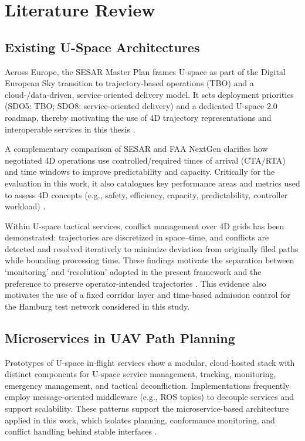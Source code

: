 \chapter{Literature Review}%
\label{s_literature}

\section{Existing U-Space Architectures}%
\label{s_motivation}

Across Europe, the SESAR Master Plan frames U-space as part of the Digital European Sky transition to trajectory-based operations (TBO) and a cloud-/data-driven, service-oriented delivery model. It sets deployment priorities (SDO5: TBO; SDO8: service-oriented delivery) and a dedicated U-space 2.0 roadmap, thereby motivating the use of 4D trajectory representations and interoperable services in this thesis \cite{sesar_master_plan_2025}.

A complementary comparison of SESAR and FAA NextGen clarifies how negotiated 4D operations use controlled/required times of arrival (CTA/RTA) and time windows to improve predictability and capacity. Critically for the evaluation in this work, it also catalogues key performance areas and metrics used to assess 4D concepts (e.g., safety, efficiency, capacity, predictability, controller workload) \cite{enea_porretta_4d_tbo_comparison}.

Within U-space tactical services, conflict management over 4D grids has been demonstrated: trajectories are discretized in space–time, and conflicts are detected and resolved iteratively to minimize deviation from originally filed paths while bounding processing time. These findings motivate the separation between ‘monitoring’ and ‘resolution’ adopted in the present framework and the preference to preserve operator-intended trajectories \cite{acevedo_4d_grids_u_space}.
This evidence also motivates the use of a fixed corridor layer and time-based admission control for the Hamburg test network considered in this study.

\section{Microservices in UAV Path Planning}%
\label{s_contribution}

Prototypes of U-space in-flight services show a modular, cloud-hosted stack with distinct components for U-space service management, tracking, monitoring, emergency management, and tactical deconfliction. Implementations frequently employ message-oriented middleware (e.g., ROS topics) to decouple services and support scalability. These patterns support the microservice-based architecture applied in this work, which isolates planning, conformance monitoring, and conflict handling behind stable interfaces \cite{uspace_inflight_services_architecture}.

